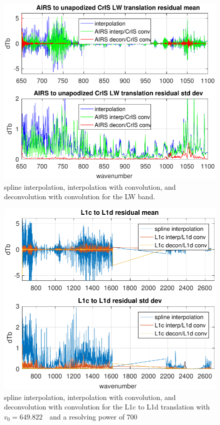 \documentclass[10pt,twocolumn]{article}
\begin{document}
\begin{figure} %
  \centering
  \includegraphics[width=\linewidth]{figures/a2cris_interp_LW.pdf}
  \caption{spline interpolation, interpolation with convolution, 
    and deconvolution with convolution for the {\cris} LW band.}
  \label{intpLW}
\end{figure}

\begin{figure} %
  \centering
  \includegraphics[width=\linewidth]{figures/CtoD_interp_diff.pdf}
  \caption{spline interpolation, interpolation with convolution, 
    and deconvolution with convolution for the {\airs} L1c to L1d
    translation with $v_0=649.822$~\wn\ and a resolving power of 700}
  \label{interpL1d}
\end{figure}
\end{document}

